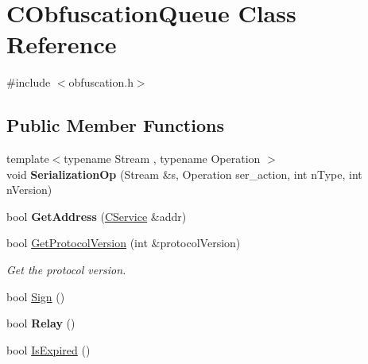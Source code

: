 \hypertarget{class_c_obfuscation_queue}{}\section{C\+Obfuscation\+Queue Class Reference}
\label{class_c_obfuscation_queue}


{\ttfamily \#include $<$obfuscation.\+h$>$}

\subsection*{Public Member Functions}
\begin{DoxyCompactItemize}
\item 
\mbox{\label{class_c_obfuscation_queue_a6092fe0b952622adc486ae0348b59685}} 
{\footnotesize template$<$typename Stream , typename Operation $>$ }\\void {\bfseries Serialization\+Op} (Stream \&s, Operation ser\+\_\+action, int n\+Type, int n\+Version)
\item 
\mbox{\label{class_c_obfuscation_queue_a2397bea1f4a2d6cfb03c204efb73e289}} 
bool {\bfseries Get\+Address} (\mbox{\hyperlink{class_c_service}{C\+Service}} \&addr)
\item 
\mbox{\label{class_c_obfuscation_queue_aa9cb25ce886877a54c0bf6ad39b758d6}} 
bool \mbox{\hyperlink{class_c_obfuscation_queue_aa9cb25ce886877a54c0bf6ad39b758d6}{Get\+Protocol\+Version}} (int \&protocol\+Version)
\begin{DoxyCompactList}\small\item\em Get the protocol version. \end{DoxyCompactList}\item 
bool \mbox{\hyperlink{class_c_obfuscation_queue_a7d7be50e6c9ca531f4a4b69a3f7c0b79}{Sign}} ()
\item 
\mbox{\label{class_c_obfuscation_queue_a64da4819a28a700dc363f03e444d468c}} 
bool {\bfseries Relay} ()
\item 
\mbox{\label{class_c_obfuscation_queue_aab0bc5d5310034436ff67c49699f16ea}} 
bool \mbox{\hyperlink{class_c_obfuscation_queue_aab0bc5d5310034436ff67c49699f16ea}{Is\+Expired}} ()

\end{DoxyCompactItemize}
